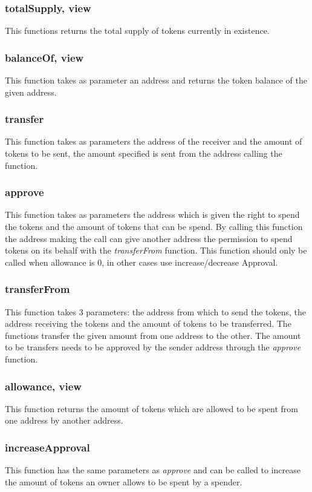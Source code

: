 \documentclass[12pt,a4paper]{article}
\begin{document}
\subsubsection*{totalSupply, view}
This functions returns the total supply of tokens currently in existence.
\subsubsection*{balanceOf, view}
This function takes as parameter an address and returns the token balance of the given address.
\subsubsection*{transfer}
This function takes as parameters the address of the receiver and the amount of tokens to be sent, the amount specified is sent from the address calling the function.
\subsubsection*{approve}
This function takes as parameters the address which is given the right to spend the tokens and the amount of tokens that can be spend. By calling this function the address making the call can give another address the permission to spend tokens on its behalf with the \textit{transferFrom} function. This function should only be called when allowance is 0, in other cases use increase/decrease Approval.
\subsubsection*{transferFrom}
This function takes 3 parameters: the address from which to send the tokens, the address receiving the tokens and the amount of tokens to be transferred. The functions transfer the given amount from one address to the other. The amount to be transfers needs to be approved by the sender address through the \textit{approve} function. 
\subsubsection*{allowance, view}
This function returns the amount of tokens which are allowed to be spent from one address by another address.
\subsubsection*{increaseApproval}
This function has the same parameters as \textit{approve} and can be called to increase the amount of tokens an owner allows to be spent by a spender. 
\end{document}

